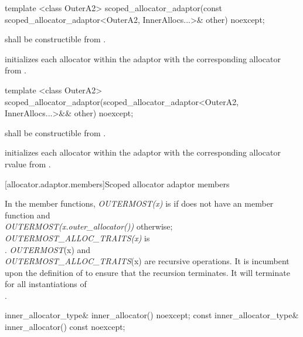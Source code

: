 %
\begin{itemdecl}
template <class OuterA2>
  scoped_allocator_adaptor(const scoped_allocator_adaptor<OuterA2,
                                                          InnerAllocs...>& other) noexcept;
\end{itemdecl}

\begin{itemdescr}
\pnum
\requires {} shall be constructible from .

\pnum
\effects initializes each allocator within the adaptor with the corresponding allocator
from .
\end{itemdescr}

%
\begin{itemdecl}
template <class OuterA2>
  scoped_allocator_adaptor(scoped_allocator_adaptor<OuterA2,
                                                    InnerAllocs...>&& other) noexcept;
\end{itemdecl}

\begin{itemdescr}
\pnum
\requires {} shall be constructible from .

\pnum
\effects initializes each allocator within the adaptor with the corresponding allocator rvalue
from .
\end{itemdescr}

[allocator.adaptor.members]{Scoped allocator adaptor members}

\pnum
In the  member functions,
\textit{OUTERMOST(x)} is  if  does not have an
 member function and \\
\textit{OUTERMOST(x.outer_allocator())}
otherwise;
\textit{OUTERMOST_ALLOC_TRAITS(x)} is \\
.
\enternote \textit{OUTERMOST}(x) and \\
\textit{OUTERMOST_ALLOC_TRAITS}(x) are recursive operations. It
is incumbent upon the definition of  to ensure that the
recursion terminates. It will terminate for all instantiations of \\
. \exitnote

%
%
\begin{itemdecl}
inner_allocator_type& inner_allocator() noexcept;
const inner_allocator_type& inner_allocator() const noexcept;
\end{itemdecl}

